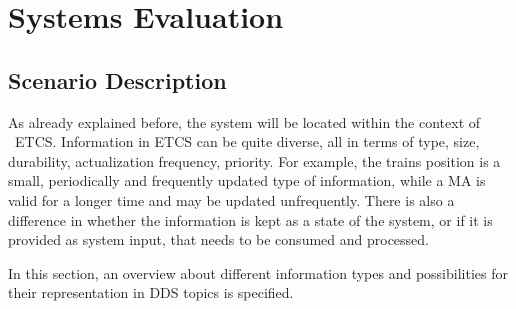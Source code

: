 \chapter{Systems Evaluation}
\label{chptr:evaluation}

\section{Scenario Description}

As already explained before, the system will be located within the context of ~\gls*{ETCS}.
Information in \gls*{ETCS} can be quite diverse, all in terms of type, size, durability, actualization frequency, priority.
For example, the trains position is a small, periodically and frequently updated type of information, while a \gls*{MA} is valid for a longer time and may be updated unfrequently.
There is also a difference in whether the information is kept as a state of the system, or if it is provided as system input, that needs to be consumed and processed.

In this section, an overview about different information types and possibilities for their representation in \gls*{DDS} topics is specified.


